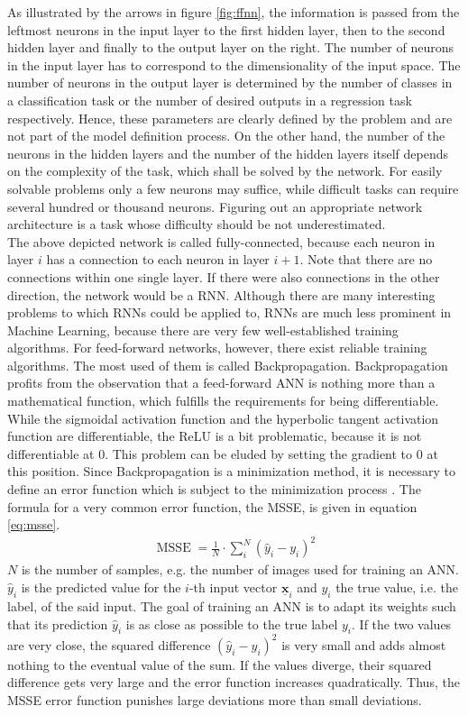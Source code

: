 \documentclass[11pt, a4paper]{article}
\newcommand\V[1]{\ensuremath{\underline{\mathbf{#1}}}}
\begin{document}
As illustrated by the arrows in figure \ref{fig:ffnn}, the information is passed from the leftmost neurons in the input layer to the first hidden layer, then to the second hidden layer and finally to the output layer on the right. The number of neurons in the input layer has to correspond to the dimensionality of the input space. The number of neurons in the output layer is determined by the number of classes in a classification task or the number of desired outputs in a regression task respectively. Hence, these parameters are clearly defined by the problem and are not part of the model definition process. On the other hand, the number of the neurons in the hidden layers and the number of the hidden layers itself depends on the complexity of the task, which shall be solved by the network. For easily solvable problems only a few neurons may suffice, while difficult tasks can require several hundred or thousand neurons. Figuring out an appropriate network architecture is a task whose difficulty should be not underestimated.\\
The above depicted network is called fully-connected, because each neuron in layer $i$ has a connection to each neuron in layer $i + 1$. Note that there are no connections within one single layer. If there were also connections in the other direction, the network would be a \ac{RNN}. Although there are many interesting problems to which \acp{RNN} could be applied to, \acp{RNN} are much less prominent in Machine Learning, because there are very few well-established training algorithms. For feed-forward networks, however, there exist reliable training algorithms. The most used of them is called Backpropagation. Backpropagation profits from the observation that a feed-forward \ac{ANN} is nothing more than a mathematical function, which fulfills the requirements for being differentiable. While the sigmoidal activation function and the hyperbolic tangent activation function are differentiable, the \ac{ReLU} is a bit problematic, because it is not differentiable at $0$. This problem can be eluded by setting the gradient to $0$ at this position. Since Backpropagation is a minimization method, it is necessary to define an error function which is subject to the minimization process . The formula for a very common error function, the \ac{MSSE}, is given in equation \eqref{eq:msse}.
\label{msse}
\begin{align}
\label{eq:msse}
\operatorname{MSSE} = \frac{1}{N} \cdot \sum_{i}^{N} \left(\hat{y}_i - y_i\right)^2
\end{align}
$N$ is the number of samples, e.g. the number of images used for training an \ac{ANN}. $\hat{y}_i$ is the predicted value for the $i$-th input vector $\V{x}_i$ and $y_i$ the true value, i.e. the label, of the said input. The goal of training an \ac{ANN} is to adapt its weights such that its prediction $\hat{y}_i$ is as close as possible to the true label $y_i$. If the two values are very close, the squared difference $(\hat{y}_i - y_i)^2$ is very small and adds almost nothing to the eventual value of the sum. If the values diverge, their squared difference gets very large and the error function increases quadratically. Thus, the \ac{MSSE} error function punishes large deviations more than small deviations.\\
\end{document}
